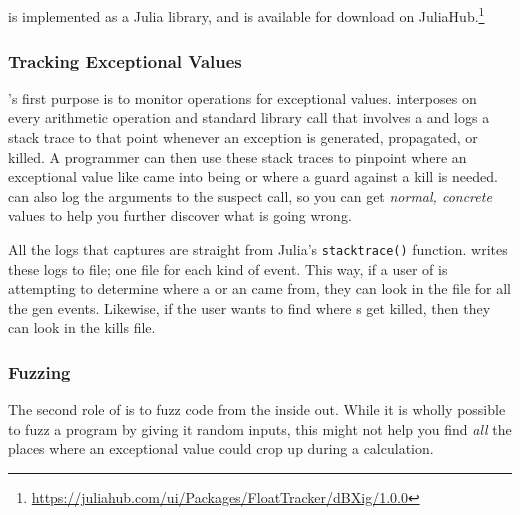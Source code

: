 \documentclass{juliacon}
\begin{document}

\subsection{\FT{}}
\label{s:floattracker}

\FT{} is implemented as a Julia library, and is available for download on JuliaHub.\footnote{\url{https://juliahub.com/ui/Packages/FloatTracker/dBXig/1.0.0}}

\subsubsection{Tracking Exceptional Values}
\label{s:trackingexceptionalvalues}

\FT{}'s first purpose is to monitor \fp{} operations for exceptional values.
\FT{} interposes on every arithmetic operation and standard library call that involves a \fp{} and logs a stack trace to that point whenever an exception is generated, propagated, or killed.
A programmer can then use these stack traces to pinpoint where an exceptional value like \NaN{} came into being or where a guard against a \NaN{} kill is needed.
\FT{} can also log the arguments to the suspect call, so you can get \emph{normal, concrete} values to help you further discover what is going wrong.

All the logs that \FT{} captures are straight from Julia's \texttt{stacktrace()} function.
\FT{} writes these logs to file; one file for each kind of event.
This way, if a user of \FT{} is attempting to determine where a \NaN{} or an \Inf{} came from, they can look in the file for all the gen events.
Likewise, if the user wants to find where \NaN{}s get killed, then they can look in the kills file.

\subsubsection{Fuzzing}

The second role of \FT{} is to fuzz code from the inside out.
While it is wholly possible to fuzz a program by giving it random inputs, this might not help you find \emph{all} the places where an exceptional value could crop up during a calculation.\cite{ddghlllprr-correctness-2022}
\end{document}
